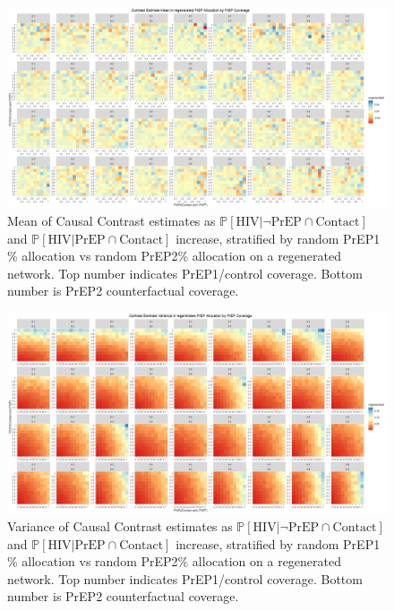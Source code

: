 \documentclass{article}
\theoremstyle{definition}
\begin{document}
\begin{figure}[H]
    \centering
    \includegraphics[width=\linewidth]{Figures/PrEP Regenerated Mean Plots.png}
    \caption{Mean of Causal Contrast estimates as $\mathbb{P}\left[\text{HIV} \vert \neg \text{PrEP} \cap \text{Contact}\right]$ and $\mathbb{P}\left[\text{HIV} \vert \text{PrEP} \cap \text{Contact}\right]$ increase, stratified by  random PrEP1 \% allocation vs random PrEP2\% allocation on a regenerated network. Top number indicates PrEP1/control coverage. Bottom number is PrEP2 counterfactual coverage.}
    \label{fig:Figure 21}
\end{figure}
\begin{figure}[H]
    \centering
    \includegraphics[width=\linewidth]{Figures/PrEP Regenerated Variance Plots.png}
    \caption{Variance of Causal Contrast estimates as $\mathbb{P}\left[\text{HIV} \vert \neg \text{PrEP} \cap \text{Contact}\right]$ and $\mathbb{P}\left[\text{HIV} \vert \text{PrEP} \cap \text{Contact}\right]$ increase, stratified by random PrEP1 \% allocation vs random PrEP2\% allocation on a regenerated network. Top number indicates PrEP1/control coverage. Bottom number is PrEP2 counterfactual coverage. }
    \label{fig:Figure 22}
\end{figure}
\end{document}
